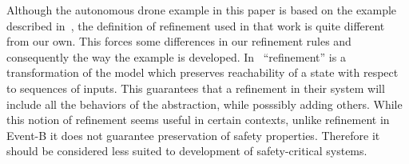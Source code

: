 Although the autonomous drone example in this paper is based on the
example described in~\cite{Syriani_2019}, the definition of refinement
used in that work is quite different from our own. This forces some
differences in our refinement rules and consequently the way the
example is developed. In~\cite{Syriani_2019} ``refinement'' is a
transformation of the model which preserves reachability of a state
with respect to sequences of inputs. This guarantees that a refinement
in their system will include all the behaviors of the abstraction,
while posssibly adding others. While this notion of refinement seems
useful in certain contexts, unlike refinement in Event-B it does not
guarantee preservation of safety properties. Therefore it should be
considered less suited to development of safety-critical systems.

